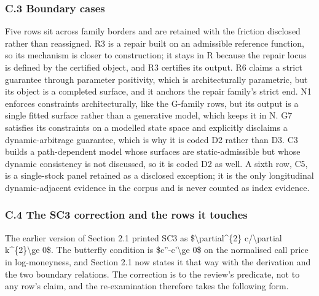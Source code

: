 \documentclass[11pt]{article}
\begin{document}
\subsubsection*{C.3 Boundary cases}
Five rows sit across family borders and are retained with the friction disclosed rather than reassigned. R3 is a repair built on an admissible reference function, so its mechanism is closer to construction; it stays in R because the repair locus is defined by the certified object, and R3 certifies its output. R6 claims a strict guarantee through parameter positivity, which is architecturally parametric, but its object is a completed surface, and it anchors the repair family's strict end. N1 enforces constraints architecturally, like the G-family rows, but its output is a single fitted surface rather than a generative model, which keeps it in N. G7 satisfies its constraints on a modelled state space and explicitly disclaims a dynamic-arbitrage guarantee, which is why it is coded D2 rather than D3. C3 builds a path-dependent model whose surfaces are static-admissible but whose dynamic consistency is not discussed, so it is coded D2 as well. A sixth row, C5, is a single-stock panel retained as a disclosed exception; it is the only longitudinal dynamic-adjacent evidence in the corpus and is never counted as index evidence.

\subsubsection*{C.4 The SC3 correction and the rows it touches}
The earlier version of Section 2.1 printed SC3 as \$\textbackslash{}partial\textasciicircum{}\{2\} c/\textbackslash{}partial k\textasciicircum{}\{2\}\textbackslash{}ge 0\$. The butterfly condition is \$c''-c'\textbackslash{}ge 0\$ on the normalised call price in log-moneyness, and Section 2.1 now states it that way with the derivation and the two boundary relations. The correction is to the review's predicate, not to any row's claim, and the re-examination therefore takes the following form.
\end{document}
